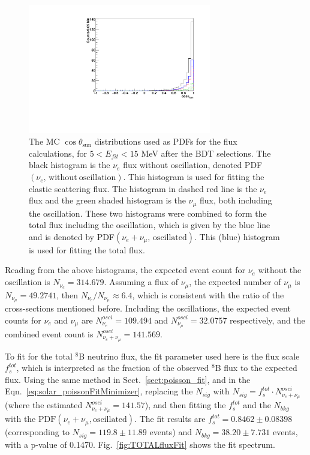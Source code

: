 \begin{figure}[!htb]
	\centering
	\includegraphics[width=8cm]{MCfluxPdfs.pdf}
	\caption[The MC $\cos\theta_\mathrm{sun}$ distributions used as PDFs for the flux calculations after the BDT selections ($5<E_{fit}<15$ MeV).]{The MC $\cos\theta_\mathrm{sun}$ distributions used as PDFs for the flux calculations, for $5<E_{fit}<15$ MeV after the BDT selections. The black histogram is the $\nu_e$ flux without oscillation, denoted PDF$(\nu_e, \, \mathrm{without~oscillation})$. This histogram is used for fitting the elastic scattering flux. The histogram in dashed red line is the $\nu_e$ flux and the green shaded histogram is the $\nu_\mu$ flux, both including the oscillation. These two histograms were combined to form the total flux including the oscillation, which is given by the blue line and is denoted by PDF$(\nu_e+\nu_\mu, \, \mathrm{oscillated})$. This (blue) histogram is used for fitting the total flux.\label{fig:MCfluxPdfs}}
\end{figure} 

Reading from the above histograms, the expected event count for $\nu_e$ without the oscillation is $N_{\nu_e} = 314.679$. Assuming a flux of $\nu_\mu$, the expected number of $\nu_\mu$ is $N_{\nu_\mu}=49.2741$, then $N_{\nu_e}/N_{\nu_\mu}\approx 6.4$, which is consistent with the ratio of the cross-sections mentioned before. Including the oscillations, the expected event counts for $\nu_e$ and $\nu_\mu$ are $N^{osci}_{\nu_e} = 109.494$ and $N^{osci}_{\nu_\mu} = 32.0757$ respectively, and the combined event count is $N^{osci}_{\nu_e+\nu_\mu}=141.569$. %
 
To fit for the total $^8$B neutrino flux, the fit parameter used here is the flux scale $f^{tot}_s$, which is interpreted as the fraction of the observed $^8$B flux to the expected flux. Using the same method in Sect.~\ref{sect:poisson_fit}, and in the Eqn.~\ref{eq:solar_poissonFitMinimizer}, replacing the $N_{sig}$ with $N_{sig}=f^{tot}_s\cdot N^{osci}_{\nu_e+\nu_\mu}$(where the estimated $N^{osci}_{\nu_e+\nu_\mu}=141.57$), and then fitting the $f^{tot}_s$ and the $N_{bkg}$ with the $\mathrm{PDF}(\nu_e+\nu_\mu,\mathrm{oscillated})$. The fit results are $f^{tot}_s=0.8462\pm 0.08398$ (corresponding to $N_{sig}=119.8\pm11.89$ events) and $N_{bkg}=38.20\pm7.731$ events, with a p-value of 0.1470. Fig.~\ref{fig:TOTALfluxFit} shows the fit spectrum.

